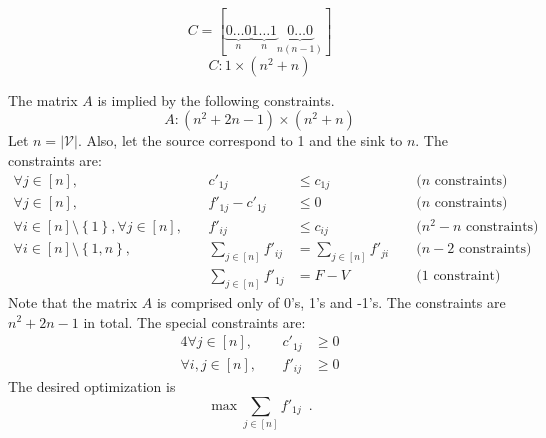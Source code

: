 \begin{equation*}
  C = [\underbrace{0 \dots 0}_{n}
      \underbrace{1 \dots 1}_{n}
      \underbrace{0 \dots 0}_{n\left(n - 1\right)}]
\end{equation*}
\begin{equation*}
  C : 1 \times \left(n^2 + n\right)
\end{equation*}

The matrix $A$ is implied by the following constraints.
\begin{equation*}
  A : \left(n^2 + 2n - 1\right) \times \left(n^2 + n\right)
\end{equation*}
Let $n = |\mathcal{V}|$. Also, let the source correspond to 1 and the sink to $n$. The constraints are:
\begin{equation}
\label{lp:primal:constraints}
\begin{alignedat}{4}
  \forall j \in \left[n\right], && c'_{1j} &\leq c_{1j} &&\mbox{ ($n$ constraints)} \\
  \forall j \in \left[n\right], &\:& f'_{1j} - c'_{1j} &\leq 0 &&\mbox{ ($n$ constraints)} \\
  \forall i \in \left[n\right] \setminus \left\{1\right\}, \forall j \in \left[n\right], && f'_{ij} &\leq c_{ij}
    &&\mbox{ ($n^2 - n$ constraints)} \\
  \forall i \in \left[n\right] \setminus \left\{1, n\right\}, && \sum\limits_{j \in \left[n\right]}f'_{ij} &=
    \sum\limits_{j \in \left[n\right]}f'_{ji} &&\mbox{ ($n-2$ constraints)} \\
  && \sum\limits_{j \in \left[n\right]}f'_{1j} &= F - V &&\mbox{ (1 constraint)}
\end{alignedat}
\end{equation}
Note that the matrix $A$ is comprised only of 0's, 1's and -1's. The constraints are $n^2 + 2n - 1$ in total. The special
constraints are:
\begin{alignat*}{4}
  \forall j \in \left[n\right], &\:& c'_{1j} &\geq 0 \\
  \forall i, j \in \left[n\right], &\:& f'_{ij} &\geq 0
\end{alignat*}
The desired optimization is
\begin{equation*}
  \max{\sum\limits_{j \in \left[n\right]}f'_{1j}} \enspace.
\end{equation*}
